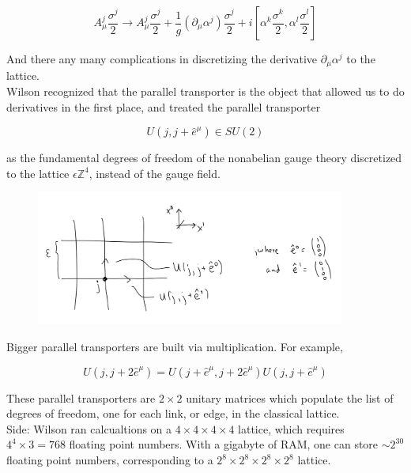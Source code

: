 \begin{equation}
A_\mu^j \frac{\sigma^j}{2} \rightarrow A_\mu^j \frac{\sigma^j}{2} + \frac{1}{g} (\partial_\mu \alpha^j) \frac{\sigma^j}{2} + i \left[\alpha^k \frac{\sigma^k}{2}, \alpha^l \frac{\sigma^l}{2}\right]
\end{equation}

\noindent And there any many complications in discretizing the derivative $\partial_\mu \alpha^j$ to the lattice. \\

\noindent Wilson recognized that the parallel transporter is the object that allowed us to do derivatives in the first place, and treated the parallel transporter 

\begin{equation}
U(j, j+\hat{e}^\mu) \in SU(2)
\end{equation}

as the fundamental degrees of freedom of the nonabelian gauge theory discretized to the lattice $\epsilon \mathbb{Z}^4$, instead of the gauge field.

\begin{figure}[H]
	\centering
	\includegraphics[width=4in]{images/wilson_parallel1.png}
	\caption*{}
\end{figure}

\noindent Bigger parallel transporters are built via multiplication. For example,

\begin{equation}
U(j, j+2\hat{e}^\mu) = U(j + \hat{e}^\mu, j+2\hat{e}^\mu)U(j, j+\hat{e}^\mu)
\end{equation}

\noindent These parallel transporters are $2 \times 2$ unitary matrices which populate the list of degrees of freedom, one for each link, or edge, in the classical lattice.\\

\noindent Side: Wilson ran calcualtions on a $4\times4\times4\times4$ lattice, which requires $4^4 \times 3=768$ floating point numbers. With a gigabyte of RAM, one can store $\sim 2^{30}$ floating point numbers, corresponding to a $2^8 \times 2^8 \times 2^8 \times 2^8$ lattice. \\

